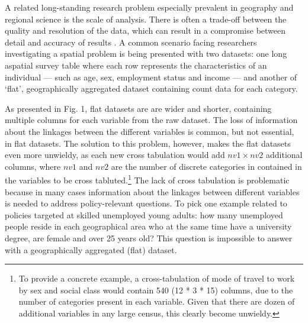 \documentclass[a4paper,10pt]{article}
\begin{document}
A related long-standing research problem especially prevalent in geography and regional science
is the scale of analysis. There is often a trade-off between the quality and resolution 
of the data, which can result in a compromise between detail and accuracy of results 
\citep{ballas2003microsimulation-30-years}. A common scenario facing researchers investigating 
a spatial problem is being presented with two datasets: one long aspatial 
survey table where each row represents the characteristics of an individual --- such as
age, sex, employment status and income --- and another of `flat', geographically aggregated 
dataset containing count data for each category. 

As presented in Fig. 1, flat datasets are
are wider and shorter, containing multiple columns for each variable from the raw dataset.
The loss of information about the linkages between
the different variables is common, but not essential, in flat datasets. 
The solution to this problem, however, makes the flat datasets even more unwieldy, as
each new cross tabulation would add $nv1 \times nv2$ additional columns, where 
$nv1$ and $nv2$ are the number of discrete categories in contained in the variables to be
cross tabluted.\footnote{To 
provide a concrete example, a cross-tabulation 
of mode of travel to work by sex and social class would contain 540 (12 * 3 * 15) columns,
due to the number of categories present in each variable. 
Given that there are dozen of additional variables in any large census, this clearly become unwieldy.
} %
The lack of cross tabulation is problematic because 
in many cases information about the linkages between different variables is needed to 
address policy-relevant questions. To pick one example related to 
policies targeted at skilled unemployed young adults: how many unemployed people 
reside in each geographical area who at the same time have a university degree, 
are female and over 25 years old? This question is impossible to answer with a 
geographically aggregated (flat) dataset.
\end{document}
